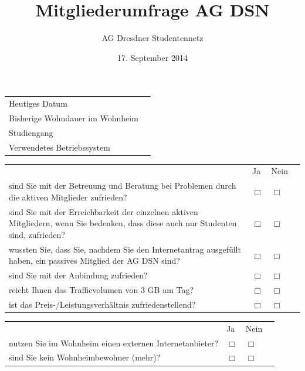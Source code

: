 \documentclass[a4paper,10pt]{scrreprt}
\title{Mitgliederumfrage AG DSN}
\author{AG Dresdner Studentennetz}
\date{17. September 2014}
\renewcommand{\vertikalblocktwo}[3]{\vspace{0.1cm}\begin{tabular}{p{10cm}p{2cm}p{2cm}p{0.001cm}}&\centering #1&\centering #2&\\#3\end{tabular}\vspace{0.5cm}}
\renewcommand{\blocktexttwo}[1]{#1\vspace{0.2cm}& \centering$\Box$ & \centering$\Box$&\\}
\renewcommand{\longline}{\raisebox{-3mm}{\parbox{8cm}{\hrule\strut}}}
\renewenvironment{answersA}{\vspace{0.25cm}\begin{addmargin}[0cm]{4cm}\begin{compactitem}[]}{\end{compactitem}\end{addmargin}}
\begin{document}
    \thispagestyle{fancy}
    \renewcommand{\headrulewidth}{0pt}
    \renewcommand{\footrulewidth}{0pt}
    \setlength\headheight{40.0pt}
    \addtolength{\textheight}{-70.0pt}
    \cfoot{}

    \begin{answersA}
        \item{}
        \item{}
        \item{}
        \item{}
        \item{}\vspace{.25cm}
        \item{}
    \end{answersA}

    \begin{tabular}{ p{6cm} l }
        Heutiges Datum & \longline \\
        Bisherige Wohndauer im Wohnheim & \longline \\
        Studiengang & \longline \\
        Verwendetes Betriebssystem & \longline
    \end{tabular}

    \vertikalblocktwo{Ja}{Nein}{
        \blocktexttwo{sind Sie mit der Betreuung und Beratung bei Problemen durch die aktiven Mitglieder zufrieden?}
        \blocktexttwo{sind Sie mit der Erreichbarkeit der einzelnen aktiven Mitgliedern, wenn Sie bedenken, dass diese auch nur Studenten sind, zufrieden?}
        \blocktexttwo{wussten Sie, dass Sie, nachdem Sie den Internetantrag ausgefüllt haben, ein passives Mitglied der AG DSN sind?}
        \blocktexttwo{sind Sie mit der Anbindung zufrieden?}
        \blocktexttwo{reicht Ihnen das Trafficvolumen von 3 GB am Tag?}
        \blocktexttwo{ist das Preis-/Leistungsverhältnis zufriedenstellend?}
    }

    \vertikalblocktwo{Ja}{Nein}{
        \blocktexttwo{nutzen Sie im Wohnheim einen externen Internetanbieter?}
        \blocktexttwo{sind Sie kein Wohnheimbewohner (mehr)?}
    }

    \opentwo
\end{document}
